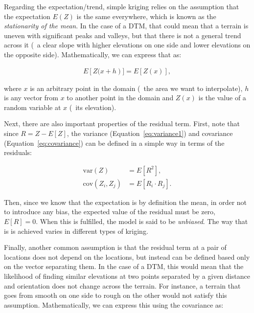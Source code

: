 Regarding the expectation/trend, simple kriging relies on the assumption that the expectation \(E(Z)\) is the same everywhere, which is known as the \emph{stationarity of the mean}.
In the case of a DTM, that could mean that a terrain is uneven with significant peaks and valleys, but that there is not a general trend across it (\eg\ a clear slope with higher elevations on one side and lower elevations on the opposite side).
Mathematically, we can express that as:

\begin{align}
\label{eq:stationarityofthemean}
E\left[Z(x+h\right)] = E\left[Z(x)\right],
\end{align}

where \(x\) is an arbitrary point in the domain (\ie\ the area we want to interpolate), \(h\) is any vector from \(x\) to another point in the domain and \(Z(x)\) is the value of a random variable at \(x\) (\eg\ its elevation).

Next, there are also important properties of the residual term.
First, note that since \(R = Z - E[Z] \), the variance (Equation~\ref{eq:variance1}) and covariance (Equation~\ref{eq:covariance}) can be defined in a simple way in terms of the residuals:

\begin{align}
\mathrm{var}\left(Z\right) &= E\left[{R}^2\right], \label{eq:varres} \\
\mathrm{cov}(Z_i,Z_j) &= E\left[R_i \cdot R_j\right]. \label{eq:covres}
\end{align}

Then, since we know that the expectation is by definition the mean, in order not to introduce any bias, the expected value of the residual must be zero, \ie\ \(E\left[R\right] = 0\).
When this is fulfilled, the model is said to be \emph{unbiased}.
The way that is is achieved varies in different types of kriging.

Finally, another common assumption is that the residual term at a pair of locations does not depend on the locations, but instead can be defined based only on the vector separating them.
In the case of a DTM, this would mean that the likelihood of finding similar elevations at two points separated by a given distance and orientation does not change across the terrain.
For instance, a terrain that goes from smooth on one side to rough on the other would not satisfy this assumption.
Mathematically, we can express this using the covariance as:


